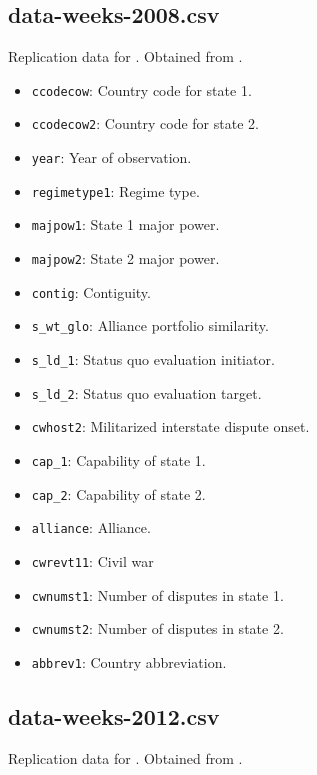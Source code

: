 \documentclass[12pt]{article}
\begin{document}
\subsection{data-weeks-2008.csv}

Replication data for \citet{Weeks:2008cj}.
Obtained from \citet{weeks2008data}.

\begin{itemize}
  \item \texttt{ccodecow}: Country code for state 1.
  \item \texttt{ccodecow2}: Country code for state 2.
  \item \texttt{year}: Year of observation.
  \item \texttt{regimetype1}: Regime type.
  \item \texttt{majpow1}: State 1 major power.
  \item \texttt{majpow2}: State 2 major power.
  \item \texttt{contig}: Contiguity.
  \item \texttt{s\_wt\_glo}: Alliance portfolio similarity.
  \item \texttt{s\_ld\_1}: Status quo evaluation initiator.
  \item \texttt{s\_ld\_2}: Status quo evaluation target.
  \item \texttt{cwhost2}: Militarized interstate dispute onset.
  \item \texttt{cap\_1}: Capability of state 1.
  \item \texttt{cap\_2}: Capability of state 2. 
  \item \texttt{alliance}: Alliance.
  \item \texttt{cwrevt11}: Civil war 
  \item \texttt{cwnumst1}: Number of disputes in state 1.
  \item \texttt{cwnumst2}: Number of disputes in state 2.
  \item \texttt{abbrev1}: Country abbreviation.
\end{itemize}


\subsection{data-weeks-2012.csv}

Replication data for \citet{Weeks:2012be}.
Obtained from \citet{weeks2012data}.
\end{document}
